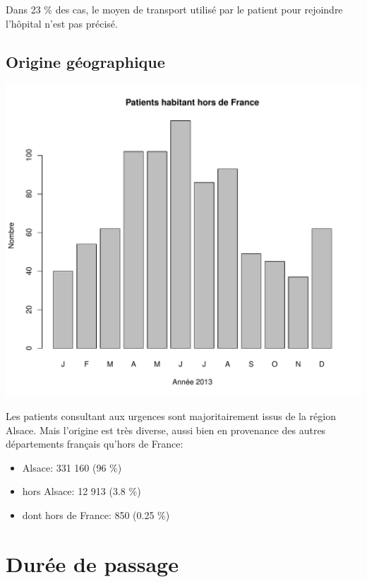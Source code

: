 \documentclass[12pt,english,french,twoside]{book}\usepackage[]{graphicx}\usepackage[]{color}
\makeatletter
\def\maxwidth{ %
  \ifdim\Gin@nat@width>\linewidth
    \linewidth
  \else
    \Gin@nat@width
  \fi
}
\newenvironment{knitrout}{}{} %
\makeatother
\begin{document}
Dans 23 \% des cas, le moyen de transport utilisé par le patient pour rejoindre l'hôpital n'est pas précisé.

\section*{Origine géographique}


\begin{knitrout}
\color{fgcolor}
\includegraphics[width=\maxwidth]{figure/origine_geo} 

\end{knitrout}

Les patients consultant aux urgences sont majoritairement issus de la région Alsace. Mais l'origine est très diverse, aussi bien en provenance des autres départements français qu'hors de France:
 \begin{itemize}
   \item Alsace: 331 160 (96 \%) 
   \item hors Alsace: 12 913 (3.8 \%) 
   \item dont hors de France: 850 (0.25 \%) 
 \end{itemize}


\newpage
\chapter{Durée de passage}
\end{document}

